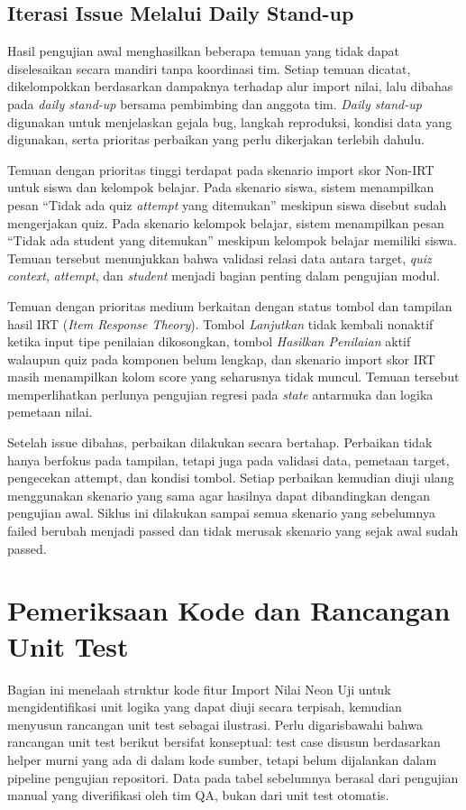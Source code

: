 \subsection{Iterasi Issue Melalui Daily Stand-up}
Hasil pengujian awal menghasilkan beberapa temuan yang tidak dapat diselesaikan secara mandiri tanpa koordinasi tim. Setiap temuan dicatat, dikelompokkan berdasarkan dampaknya terhadap alur import nilai, lalu dibahas pada \textit{daily stand-up} bersama pembimbing dan anggota tim. \textit{Daily stand-up} digunakan untuk menjelaskan gejala bug, langkah reproduksi, kondisi data yang digunakan, serta prioritas perbaikan yang perlu dikerjakan terlebih dahulu.

Temuan dengan prioritas tinggi terdapat pada skenario import skor Non-IRT untuk siswa dan kelompok belajar. Pada skenario siswa, sistem menampilkan pesan ``Tidak ada quiz \textit{attempt} yang ditemukan'' meskipun siswa disebut sudah mengerjakan quiz. Pada skenario kelompok belajar, sistem menampilkan pesan ``Tidak ada student yang ditemukan'' meskipun kelompok belajar memiliki siswa. Temuan tersebut menunjukkan bahwa validasi relasi data antara target, \textit{quiz context}, \textit{attempt}, dan \textit{student} menjadi bagian penting dalam pengujian modul.

Temuan dengan prioritas medium berkaitan dengan status tombol dan tampilan hasil IRT (\textit{Item Response Theory}). Tombol \textit{Lanjutkan} tidak kembali nonaktif ketika input tipe penilaian dikosongkan, tombol \textit{Hasilkan Penilaian} aktif walaupun quiz pada komponen belum lengkap, dan skenario import skor IRT masih menampilkan kolom score yang seharusnya tidak muncul. Temuan tersebut memperlihatkan perlunya pengujian regresi pada \textit{state} antarmuka dan logika pemetaan nilai.

Setelah issue dibahas, perbaikan dilakukan secara bertahap. Perbaikan tidak hanya berfokus pada tampilan, tetapi juga pada validasi data, pemetaan target, pengecekan attempt, dan kondisi tombol. Setiap perbaikan kemudian diuji ulang menggunakan skenario yang sama agar hasilnya dapat dibandingkan dengan pengujian awal. Siklus ini dilakukan sampai semua skenario yang sebelumnya failed berubah menjadi passed dan tidak merusak skenario yang sejak awal sudah passed.

\section{Pemeriksaan Kode dan Rancangan Unit Test}
Bagian ini menelaah struktur kode fitur Import Nilai Neon Uji untuk mengidentifikasi unit logika yang dapat diuji secara terpisah, kemudian menyusun rancangan unit test sebagai ilustrasi. Perlu digarisbawahi bahwa rancangan unit test berikut bersifat konseptual: test case disusun berdasarkan helper murni yang ada di dalam kode sumber, tetapi belum dijalankan dalam pipeline pengujian repositori. Data pada tabel sebelumnya berasal dari pengujian manual yang diverifikasi oleh tim QA, bukan dari unit test otomatis.

